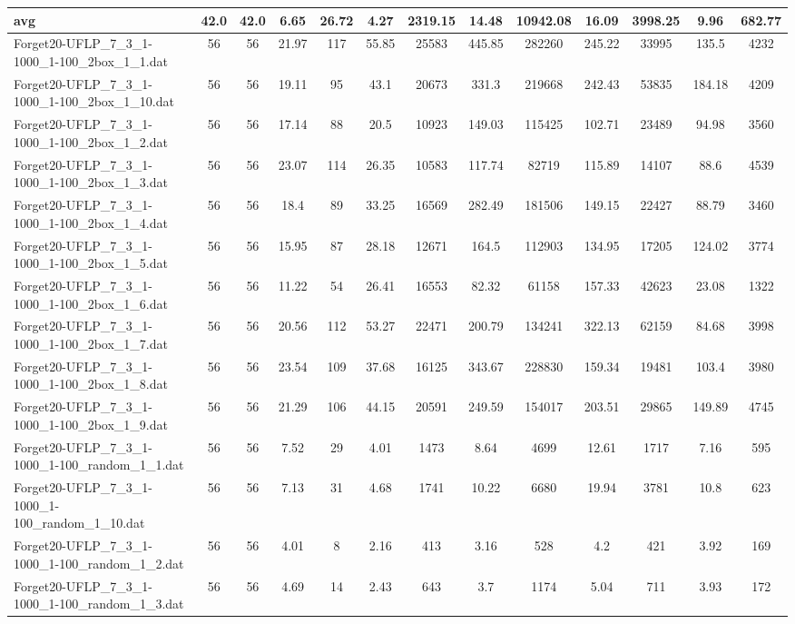 \begin{table}[!ht]
{\begin{tabular}{lcccccccccccc}
\hline avg & 42.0 & 42.0 & 6.65& 26.72 & 4.27& 2319.15 & 14.48& 10942.08 & 16.09& 3998.25 & 9.96& 682.77\\ \hline
Forget20-UFLP\_7\_3\_1-1000\_1-100\_2box\_1\_1.dat & 56 & 56 & 21.97 & 117 & 55.85 & 25583 & 445.85 & 282260 & 245.22 & 33995 & 135.5 & 4232 \\
Forget20-UFLP\_7\_3\_1-1000\_1-100\_2box\_1\_10.dat & 56 & 56 & 19.11 & 95 & 43.1 & 20673 & 331.3 & 219668 & 242.43 & 53835 & 184.18 & 4209 \\
Forget20-UFLP\_7\_3\_1-1000\_1-100\_2box\_1\_2.dat & 56 & 56 & 17.14 & 88 & 20.5 & 10923 & 149.03 & 115425 & 102.71 & 23489 & 94.98 & 3560 \\
Forget20-UFLP\_7\_3\_1-1000\_1-100\_2box\_1\_3.dat & 56 & 56 & 23.07 & 114 & 26.35 & 10583 & 117.74 & 82719 & 115.89 & 14107 & 88.6 & 4539 \\
Forget20-UFLP\_7\_3\_1-1000\_1-100\_2box\_1\_4.dat & 56 & 56 & 18.4 & 89 & 33.25 & 16569 & 282.49 & 181506 & 149.15 & 22427 & 88.79 & 3460 \\
Forget20-UFLP\_7\_3\_1-1000\_1-100\_2box\_1\_5.dat & 56 & 56 & 15.95 & 87 & 28.18 & 12671 & 164.5 & 112903 & 134.95 & 17205 & 124.02 & 3774 \\
Forget20-UFLP\_7\_3\_1-1000\_1-100\_2box\_1\_6.dat & 56 & 56 & 11.22 & 54 & 26.41 & 16553 & 82.32 & 61158 & 157.33 & 42623 & 23.08 & 1322 \\
Forget20-UFLP\_7\_3\_1-1000\_1-100\_2box\_1\_7.dat & 56 & 56 & 20.56 & 112 & 53.27 & 22471 & 200.79 & 134241 & 322.13 & 62159 & 84.68 & 3998 \\
Forget20-UFLP\_7\_3\_1-1000\_1-100\_2box\_1\_8.dat & 56 & 56 & 23.54 & 109 & 37.68 & 16125 & 343.67 & 228830 & 159.34 & 19481 & 103.4 & 3980 \\
Forget20-UFLP\_7\_3\_1-1000\_1-100\_2box\_1\_9.dat & 56 & 56 & 21.29 & 106 & 44.15 & 20591 & 249.59 & 154017 & 203.51 & 29865 & 149.89 & 4745 \\
Forget20-UFLP\_7\_3\_1-1000\_1-100\_random\_1\_1.dat & 56 & 56 & 7.52 & 29 & 4.01 & 1473 & 8.64 & 4699 & 12.61 & 1717 & 7.16 & 595 \\
Forget20-UFLP\_7\_3\_1-1000\_1-100\_random\_1\_10.dat & 56 & 56 & 7.13 & 31 & 4.68 & 1741 & 10.22 & 6680 & 19.94 & 3781 & 10.8 & 623 \\
Forget20-UFLP\_7\_3\_1-1000\_1-100\_random\_1\_2.dat & 56 & 56 & 4.01 & 8 & 2.16 & 413 & 3.16 & 528 & 4.2 & 421 & 3.92 & 169 \\
Forget20-UFLP\_7\_3\_1-1000\_1-100\_random\_1\_3.dat & 56 & 56 & 4.69 & 14 & 2.43 & 643 & 3.7 & 1174 & 5.04 & 711 & 3.93 & 172 \\

\end{tabular}}
\end{table}
